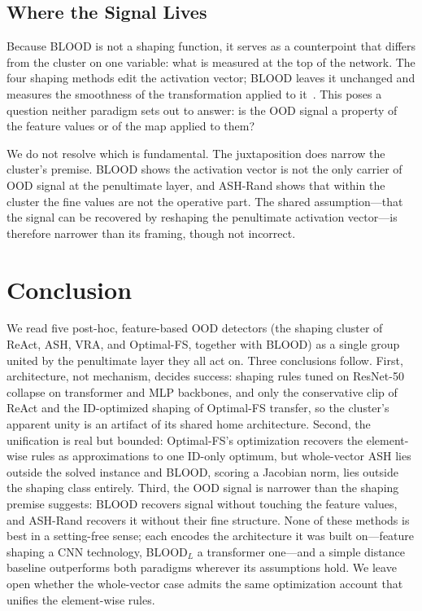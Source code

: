 \documentclass[a4paper]{article}
\begin{document}
\subsection{Where the Signal Lives}
\label{subsec:disc-carrier}
 
Because BLOOD is not a shaping function, it serves as a counterpoint that differs from
the cluster on one variable: what is measured at the top of the network. The four shaping
methods edit the activation vector; BLOOD leaves it unchanged and measures the smoothness
of the transformation applied to it~\citep{blood}. This poses a question neither paradigm
sets out to answer: is the OOD signal a property of the feature values or of the map
applied to them?

We do not resolve which is fundamental. The juxtaposition does narrow the cluster's
premise. BLOOD shows the activation vector is not the only carrier of OOD signal at the
penultimate layer, and ASH-Rand shows that within the cluster the fine values are not the
operative part. The shared assumption---that the signal can be recovered by reshaping the
penultimate activation vector---is therefore narrower than its framing, though not
incorrect.

\section{Conclusion}
\label{conc}

We read five post-hoc, feature-based OOD detectors (the shaping cluster of ReAct,
ASH, VRA, and Optimal-FS, together with BLOOD) as a single group united by the
penultimate layer they all act on. Three conclusions follow. First, architecture, not
mechanism, decides success: shaping rules tuned on ResNet-50 collapse on transformer
and MLP backbones, and only the conservative clip of ReAct and the ID-optimized shaping
of Optimal-FS transfer, so the cluster's apparent unity is an artifact of its shared
home architecture. Second, the unification is real but bounded: Optimal-FS's
optimization recovers the element-wise rules as approximations to one ID-only optimum,
but whole-vector ASH lies outside the solved instance and BLOOD, scoring a Jacobian
norm, lies outside the shaping class entirely. Third, the OOD signal is narrower than
the shaping premise suggests: BLOOD recovers signal without touching the feature
values, and ASH-Rand recovers it without their fine structure. None of these methods is
best in a setting-free sense; each encodes the architecture it was built
on---feature shaping a CNN technology, BLOOD$_L$ a transformer one---and a simple
distance baseline outperforms both paradigms wherever its assumptions hold. We leave open whether the whole-vector case admits the same optimization account
that unifies the element-wise rules.
\end{document}
